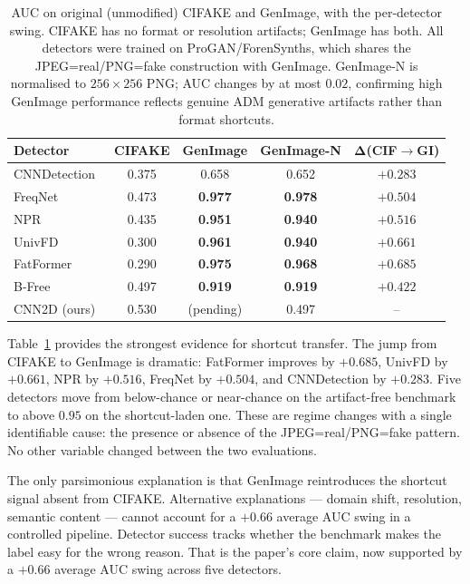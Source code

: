\documentclass{bmvc2k}
\begin{document}
\begin{table}[t]
\centering
\small
\setlength{\tabcolsep}{4pt}
\begin{tabular}{lcccc}
\toprule
\textbf{Detector} & \textbf{CIFAKE} & \textbf{GenImage} & \textbf{GenImage-N} & $\boldsymbol{\Delta}$\textbf{(CIF$\to$GI)} \\
\midrule
CNNDetection~\cite{wang2020cnn} & 0.375 & 0.658 & 0.652 & $+0.283$ \\
FreqNet~\cite{freqnet}          & 0.473 & \textbf{0.977} & \textbf{0.978} & $+0.504$ \\
NPR~\cite{npr}                  & 0.435 & \textbf{0.951} & \textbf{0.940} & $+0.516$ \\
UnivFD~\cite{univfd}            & 0.300 & \textbf{0.961} & \textbf{0.940} & $+0.661$ \\
FatFormer~\cite{fatformer}      & 0.290 & \textbf{0.975} & \textbf{0.968} & $+0.685$ \\
B-Free~\cite{bfree}             & 0.497 & \textbf{0.919} & \textbf{0.919} & $+0.422$ \\
CNN2D (ours)                    & 0.530 & (pending)       & 0.497           & --        \\
\bottomrule
\end{tabular}
\caption{AUC on original (unmodified) CIFAKE and GenImage, with the per-detector swing. CIFAKE has no format or resolution artifacts; GenImage has both. All detectors were trained on ProGAN/ForenSynths, which shares the JPEG=real/PNG=fake construction with GenImage. GenImage-N is normalised to $256\times256$ PNG; AUC changes by at most $0.02$, confirming high GenImage performance reflects genuine ADM generative artifacts rather than format shortcuts.}
\label{tab:genimage}
\end{table}

Table~\ref{tab:genimage} provides the strongest evidence for shortcut transfer. The jump from CIFAKE to GenImage is dramatic: FatFormer improves by $+0.685$, UnivFD by $+0.661$, NPR by $+0.516$, FreqNet by $+0.504$, and CNNDetection by $+0.283$. Five detectors move from below-chance or near-chance on the artifact-free benchmark to above $0.95$ on the shortcut-laden one. These are regime changes with a single identifiable cause: the presence or absence of the JPEG=real/PNG=fake pattern. No other variable changed between the two evaluations.

The only parsimonious explanation is that GenImage reintroduces the shortcut signal absent from CIFAKE. Alternative explanations --- domain shift, resolution, semantic content --- cannot account for a $+0.66$ average AUC swing in a controlled pipeline. Detector success tracks whether the benchmark makes the label easy for the wrong reason. That is the paper's core claim, now supported by a $+0.66$ average AUC swing across five detectors.
\end{document}
